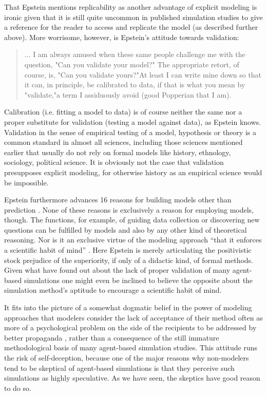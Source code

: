 \documentclass[12pt, english, a4paper]{article}
\begin{document}
That Epstein mentions replicability as another advantage of explicit
modeling is ironic given that it is still quite uncommon in published
simulation studies to give a reference for the reader to access and
replicate the model (as described further above). More worrisome,
however, is Epstein’s attitude towards validation:

\begin{quote}

  ... I am always amused when these same people challenge me with the
  question, "Can you validate your model?" The appropriate retort, of
  course, is, "Can you validate yours?"At least I can write mine down
  so that it can, in principle, be calibrated to data, if that is what
  you mean by "validate,"a term I assiduously avoid (good Popperian
  that I am). \citep[1.4]{epstein:2008}

\end{quote}

Calibration (i.e. fitting a model to data) is of course neither the
same nor a proper substitute for validation (testing a model against
data), as Epstein knows. Validation in the sense of empirical testing
of a model, hypothesis or theory is a common standard in almost all
sciences, including those sciences mentioned earlier that usually do
not rely on formal models like history, ethnology, sociology,
political science. It is obviously not the case that validation
presupposes explicit modeling, for otherwise history as an empirical
science would be impossible.

Epstein furthermore advances 16 reasons for building models other than
prediction \citep[1.9-1.17]{epstein:2008}. None of these reasons is
exclusively a reason for employing models, though. The functions, for
example, of guiding data collection or discovering new questions can
be fulfilled by models and also by any other kind of theoretical
reasoning.  Nor is it an exclusive virtue of the modeling approach
“that it enforces a scientific habit of mind”
\citep[1.6]{epstein:2008}. Here Epstein is merely articulating the
positivistic stock prejudice of the superiority, if only of a didactic
kind, of formal methods. Given what \citet{heath-et-al:2009} have
found out about the lack of proper validation of many agent-based
simulations one might even be inclined to believe the opposite about
the simulation method’s aptitude to encourage a scientific habit of
mind.

It fits into the picture of a somewhat dogmatic belief in the power of
modeling approaches that modelers consider the lack of acceptance of
their method often as more of a psychological problem on the side of
the recipients to be addressed by better propaganda \citep[2.11-2.12,
3.22-3.26]{barth-et-al:2012}, rather than a consequence of the still
immature methodological basis of many agent-based simulation
studies. This attitude runs the risk of self-deception, because one of
the major reasons why non-modelers tend to be skeptical of agent-based
simulations is that they perceive such simulations as highly
speculative. As we have seen, the skeptics have good reason to do so.
\end{document}
